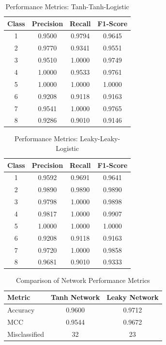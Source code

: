 \documentclass{acm_proc_article-sp}
\begin{document}
\begin{table}[h]
\centering
\caption{Performance Metrics: Tanh-Tanh-Logistic}
\begin{tabular}{cccc}
\toprule
Class & Precision & Recall & F1-Score \\
\midrule
1 & 0.9500 & 0.9794 & 0.9645 \\
2 & 0.9770 & 0.9341 & 0.9551 \\
3 & 0.9510 & 1.0000 & 0.9749 \\
4 & 1.0000 & 0.9533 & 0.9761 \\
5 & 1.0000 & 1.0000 & 1.0000 \\
6 & 0.9208 & 0.9118 & 0.9163 \\
7 & 0.9541 & 1.0000 & 0.9765 \\
8 & 0.9286 & 0.9010 & 0.9146 \\
\bottomrule
\end{tabular}
\end{table}

\begin{table}[h]
\centering
\caption{Performance Metrics: Leaky-Leaky-Logistic}
\begin{tabular}{cccc}
\toprule
Class & Precision & Recall & F1-Score \\
\midrule
1 & 0.9592 & 0.9691 & 0.9641 \\
2 & 0.9890 & 0.9890 & 0.9890 \\
3 & 0.9798 & 1.0000 & 0.9898 \\
4 & 0.9817 & 1.0000 & 0.9907 \\
5 & 1.0000 & 1.0000 & 1.0000 \\
6 & 0.9208 & 0.9118 & 0.9163 \\
7 & 0.9720 & 1.0000 & 0.9858 \\
8 & 0.9681 & 0.9010 & 0.9333 \\
\bottomrule
\end{tabular}
\end{table}

\begin{table}[h]
\centering
\caption{Comparison of Network Performance Metrics}
\begin{tabular}{lcc}
\toprule
Metric & Tanh Network & Leaky Network \\
\midrule
Accuracy & 0.9600 & 0.9712 \\
MCC & 0.9544 & 0.9672 \\
Misclassified & 32 & 23 \\
\bottomrule
\end{tabular}
\end{table}
\end{document}
